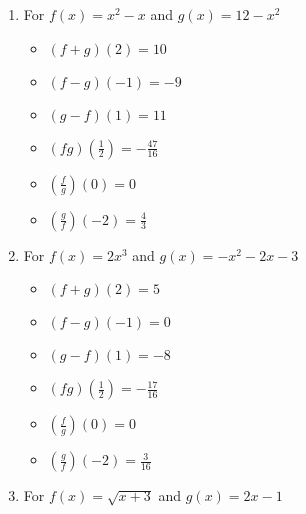 \begin{enumerate}
\item For  $f(x) = x^2 - x$ and  $g(x) = 12-x^2$

\begin{multicols}{3}
\begin{itemize}

\item  $(f+g)(2) = 10$
\item  $(f-g)(-1) = -9$
\item  $(g-f)(1) = 11$

\end{itemize}
\end{multicols}

\begin{multicols}{3}
\begin{itemize}

\item  $(fg)\left(\frac{1}{2}\right) = -\frac{47}{16}$
\item  $\left(\frac{f}{g}\right)(0) = 0$
\item  $\left(\frac{g}{f}\right)\left(-2\right) = \frac{4}{3}$

\end{itemize}
\end{multicols}

\item For $f(x) = 2x^3$ and  $g(x) = -x^2-2x-3$

\begin{multicols}{3}
\begin{itemize}

\item  $(f+g)(2) = 5$
\item  $(f-g)(-1) = 0$
\item  $(g-f)(1) = -8$

\end{itemize}
\end{multicols}

\begin{multicols}{3}
\begin{itemize}

\item  $(fg)\left(\frac{1}{2}\right) = -\frac{17}{16}$
\item  $\left(\frac{f}{g}\right)(0) = 0$
\item  $\left(\frac{g}{f}\right)\left(-2\right) = \frac{3}{16}$

\end{itemize}
\end{multicols}

\item For $f(x) = \sqrt{x+3}$ and  $g(x) = 2x-1$


\end{enumerate}
